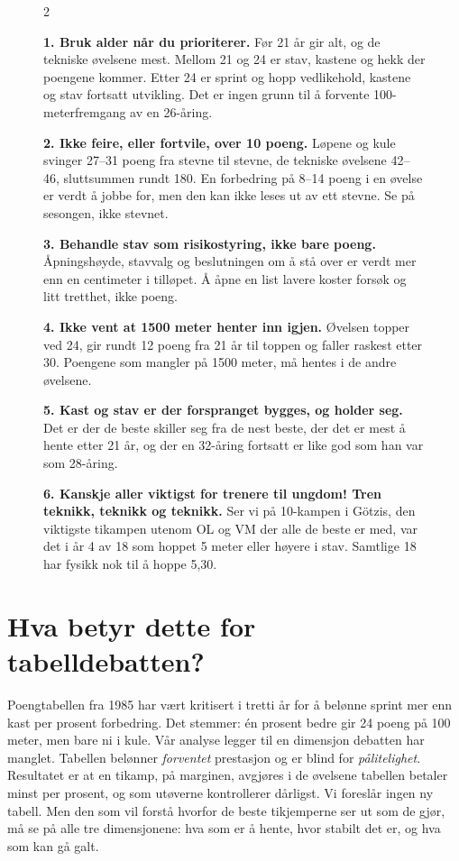 \begin{figure}[t]
\begin{raadboks}
\begin{multicols}{2}

\textbf{1. Bruk alder når du prioriterer.} Før 21 år gir alt, og de tekniske øvelsene mest. Mellom 21 og 24 er stav, kastene og hekk der poengene kommer. Etter 24 er sprint og hopp vedlikehold, kastene og stav fortsatt utvikling. Det er ingen grunn til å forvente 100-meterfremgang av en 26-åring.

\textbf{2. Ikke feire, eller fortvile, over 10 poeng.} Løpene og kule svinger 27--31 poeng fra stevne til stevne, de tekniske øvelsene 42--46, sluttsummen rundt 180. En forbedring på 8--14 poeng i en øvelse er verdt å jobbe for, men den kan ikke leses ut av ett stevne. Se på sesongen, ikke stevnet.

\textbf{3. Behandle stav som risikostyring, ikke bare poeng.} Åpningshøyde, stavvalg og beslutningen om å stå over er verdt mer enn en centimeter i tilløpet. Å åpne en list lavere koster forsøk og litt tretthet, ikke poeng.

\textbf{4. Ikke vent at 1500 meter henter inn igjen.} Øvelsen topper ved 24, gir rundt 12 poeng fra 21 år til toppen og faller raskest etter 30. Poengene som mangler på 1500 meter, må hentes i de andre øvelsene.

\textbf{5. Kast og stav er der forspranget bygges, og holder seg.} Det er der de beste skiller seg fra de nest beste, der det er mest å hente etter 21 år, og der en 32-åring fortsatt er like god som han var som 28-åring.

\textbf{6. Kanskje aller viktigst for trenere til ungdom! Tren teknikk, teknikk og teknikk.} Ser vi på 10-kampen i Götzis, den viktigste tikampen utenom OL og VM der alle de beste er med, var det i år 4 av 18 som hoppet 5 meter eller høyere i stav. Samtlige 18 har fysikk nok til å hoppe 5,30.

\end{multicols}
\end{raadboks}
\end{figure}

\section{Hva betyr dette for tabelldebatten?}\label{hva-betyr-dette-for-tabelldebatten}

Poengtabellen fra 1985 har vært kritisert i tretti år for å belønne sprint mer enn kast per prosent forbedring. Det stemmer: én prosent bedre gir 24 poeng på 100 meter, men bare ni i kule. Vår analyse legger til en dimensjon debatten har manglet. Tabellen belønner \emph{forventet} prestasjon og er blind for \emph{pålitelighet}. Resultatet er at en tikamp, på marginen, avgjøres i de øvelsene tabellen betaler minst per prosent, og som utøverne kontrollerer dårligst. Vi foreslår ingen ny tabell. Men den som vil forstå hvorfor de beste tikjemperne ser ut som de gjør, må se på alle tre dimensjonene: hva som er å hente, hvor stabilt det er, og hva som kan gå galt.\sluttmerke

